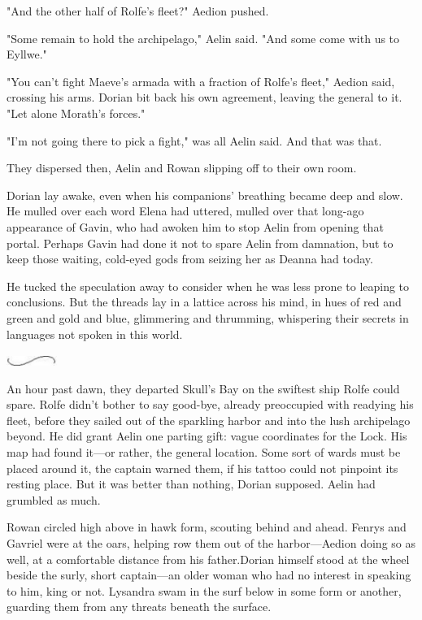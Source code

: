 "And the other half of Rolfe's fleet?" Aedion pushed.

"Some remain to hold the archipelago," Aelin said. "And some come with us to Eyllwe."

"You can't fight Maeve's armada with a fraction of Rolfe's fleet," Aedion said, crossing his arms. Dorian bit back his own agreement, leaving the general to it. "Let alone Morath's forces."

"I'm not going there to pick a fight," was all Aelin said. And that was that.

They dispersed then, Aelin and Rowan slipping off to their own room.

Dorian lay awake, even when his companions' breathing became deep and slow. He mulled over each word Elena had uttered, mulled over that long-ago appearance of Gavin, who had awoken him to stop Aelin from opening that portal. Perhaps Gavin had done it not to spare Aelin from damnation, but to keep those waiting, cold-eyed gods from seizing her as Deanna had today.

He tucked the speculation away to consider when he was less prone to leaping to conclusions. But the threads lay in a lattice across his mind, in hues of red and green and gold and blue, glimmering and thrumming, whispering their secrets in languages not spoken in this world.

\includegraphics[width=0.65in,height=0.13in]{images/seperator}

An hour past dawn, they departed Skull's Bay on the swiftest ship Rolfe could spare. Rolfe didn't bother to say good-bye, already preoccupied with readying his fleet, before they sailed out of the sparkling harbor and into the lush archipelago beyond. He did grant Aelin one parting gift: vague coordinates for the Lock. His map had found it---or rather, the general location. Some sort of wards must be placed around it, the captain warned them, if his tattoo could not pinpoint its resting place. But it was better than nothing, Dorian supposed. Aelin had grumbled as much.

Rowan circled high above in hawk form, scouting behind and ahead. Fenrys and Gavriel were at the oars, helping row them out of the harbor---Aedion doing so as well, at a comfortable distance from his father.Dorian himself stood at the wheel beside the surly, short captain---an older woman who had no interest in speaking to him, king or not. Lysandra swam in the surf below in some form or another, guarding them from any threats beneath the surface.

